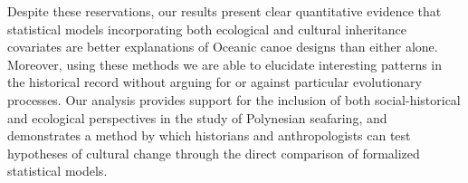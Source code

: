 \documentclass[11pt]{article}
\begin{document}
Despite these reservations, our results present clear quantitative evidence that statistical models incorporating both ecological and cultural inheritance covariates are better explanations of Oceanic canoe designs than either alone. Moreover, using these methods we are able to elucidate interesting patterns in the historical record without arguing for or against particular evolutionary processes. Our analysis provides support for the inclusion of both social-historical and ecological perspectives in the study of Polynesian seafaring, and demonstrates a method by which historians and anthropologists can test hypotheses of cultural change through the direct comparison of formalized statistical models. 



\end{document}
